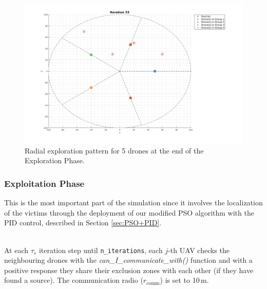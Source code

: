 \begin{figure}
    \centering
    \includegraphics[width=\textwidth]{images/exploration_pattern.jpg} 
    \caption{Radial exploration pattern for 5 drones at the end of the Exploration Phase.}
    \label{fig:exploration_pattern}
\end{figure}

\subsubsection{Exploitation Phase}
This is the most important part of the simulation since it involves
the localization of the victims through the deployment of our modified PSO
algorithm with the PID control, described in Section \ref{sec:PSO+PID}.

\noindent\\
At each $\tau_s$ iteration step until \texttt{n\_iterations},
each $j$-th UAV checks the neighbouring drones with the
\textit{can\_I\_communicate\_with()} function and with a 
positive response they share their exclusion zones with each other
(if they have found a source). The communication radio (\(r_{\text{comm}}\))
is set to 10\,m.

